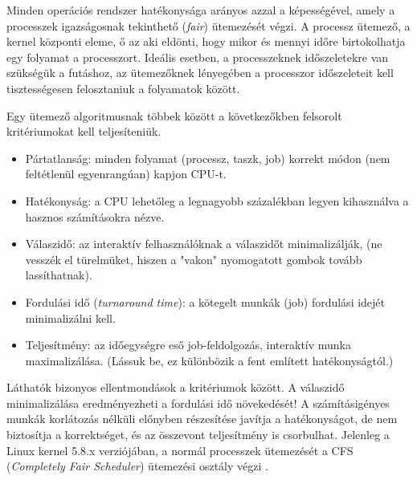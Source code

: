 \label{ch:scheduling}


Minden operációs rendszer hatékonysága arányos azzal a képességével, amely a processzek igazságosnak tekinthető (\textit{fair}) ütemezését végzi. A processz ütemező, a kernel központi eleme, ő az aki eldönti, hogy mikor és mennyi időre birtokolhatja egy folyamat a processzort. Ideális esetben, a processzeknek időszeletekre van szükségük a futáshoz, az ütemezőknek lényegében a processzor időszeleteit kell tisztességesen felosztaniuk a folyamatok között.

Egy ütemező algoritmusnak többek között a következőkben felsorolt kritériumokat kell teljesíteniük.
\begin{itemize}
	\item Pártatlanság: minden folyamat (processz, taszk, job) korrekt módon (nem feltétlenül egyenrangúan) kapjon CPU-t.
	\item Hatékonyság: a CPU lehetőleg a legnagyobb százalékban legyen kihasználva a hasznos számításokra nézve.
	\item Válaszidő: az interaktív felhasználóknak a válaszidőt minimalizálják, (ne vesszék el türelmüket, hiszen a "vakon" nyomogatott gombok tovább lassíthatnak).
	\item Fordulási idő (\textit{turnaround time}): a kötegelt munkák (job) fordulási idejét minimalizálni
kell.
	\item Teljesítmény: az időegységre eső job-feldolgozás, interaktív munka maximalizálása.
(Lássuk be, ez különbözik a fent említett hatékonyságtól.)
\end{itemize}
Láthatók bizonyos ellentmondások a kritériumok között. A válaszidő minimalizálása eredményezheti a fordulási idő növekedését!
A számításigényes munkák korlátozás nélküli
előnyben részesítése javítja a hatékonyságot, de nem biztosítja a korrektséget, és az összevont
teljesítmény is csorbulhat.
Jelenleg a Linux kernel 5.8.x verziójában, a normál processzek ütemezését a CFS (\textit{Completely Fair Scheduler}) ütemezési osztály végzi \cite{wong2008towards}.



